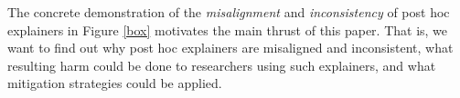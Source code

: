 \documentclass[mnsc,blindrev]{informs3}
\begin{document}
The concrete demonstration of the \textit{misalignment} and \textit{inconsistency} of post hoc explainers in Figure \ref{box} motivates the main thrust of this paper. That is, we want to find out why post hoc explainers are misaligned and inconsistent, what resulting harm could be done to researchers using such explainers, and what mitigation strategies could be applied. %
\end{document}
